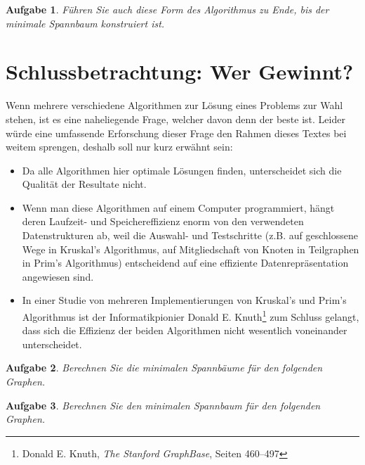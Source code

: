 \documentclass[12pt,a4paper]{report}
\theoremstyle{break}
\newtheorem{exercise}{Aufgabe}[chapter]
\theoremstyle{plain}
\begin{document}
\pagebreak
\begin{exercise}\label{exprimadj}
F\"{u}hren Sie auch diese Form des Algorithmus zu
Ende, bis der minimale Spannbaum konstruiert ist.
\end{exercise}

\section{Schlussbetrachtung: Wer Gewinnt?}

Wenn mehrere verschiedene Algorithmen zur L\"{o}sung eines Problems
zur Wahl stehen, ist es eine naheliegende Frage, welcher davon denn
der beste ist. Leider w\"{u}rde eine umfassende Erforschung dieser
Frage den Rahmen dieses Textes bei weitem sprengen, deshalb soll nur
kurz erw\"{a}hnt sein:

\begin{itemize}
\item Da alle Algorithmen hier optimale L\"{o}sungen finden,
  unterscheidet sich die Qualit\"{a}t der Resultate nicht.
\item Wenn man diese Algorithmen auf einem Computer programmiert,
  h\"{a}ngt deren Laufzeit- und Speichereffizienz enorm von den
  verwendeten Datenstrukturen ab, weil die Auswahl- und Testschritte
  (z.B. auf geschlossene Wege in Kruskal's Algorithmus, auf
  Mitgliedschaft von Knoten in Teilgraphen in Prim's Algorithmus)
  entscheidend auf eine effiziente Datenrepr\"{a}sentation angewiesen sind.
\item In einer Studie von mehreren Implementierungen von Kruskal's und
  Prim's Algorithmus ist der Informatikpionier Donald
  E. Knuth\footnote{Donald E. Knuth, \emph{The Stanford GraphBase},
    Seiten 460--497} zum Schluss
  gelangt, dass sich die Effizienz der beiden Algorithmen nicht
  wesentlich voneinander unterscheidet.
\end{itemize}

\newpage
\begin{exercise}\label{exfinal1}
Berechnen Sie die minimalen Spannb\"{a}ume f\"{u}r den folgenden
Graphen.

\end{exercise}
\begin{exercise}\label{exfinal2}
Berechnen Sie den minimalen Spannbaum f\"{u}r den folgenden Graphen.

\end{exercise}
\end{document}
